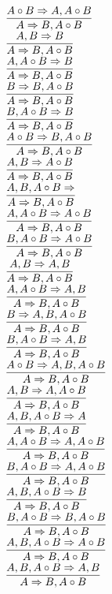 \documentclass[11pt]{article}
\begin{document}
\begin{center}
\bigskip
\\$\infer{A\Rightarrow B, A\circ B}{A\circ B\Rightarrow A, A\circ B}$
\bigskip
\\$\infer{A\Rightarrow B, A\circ B}{A, B\Rightarrow B}$
\bigskip
\\$\infer{A\Rightarrow B, A\circ B}{A, A\circ B\Rightarrow B}$
\bigskip
\\$\infer{A\Rightarrow B, A\circ B}{B\Rightarrow B, A\circ B}$
\bigskip
\\$\infer{A\Rightarrow B, A\circ B}{B, A\circ B\Rightarrow B}$
\bigskip
\\$\infer{A\Rightarrow B, A\circ B}{A\circ B\Rightarrow B, A\circ B}$
\bigskip
\\$\infer{A\Rightarrow B, A\circ B}{A, B\Rightarrow A\circ B}$
\bigskip
\\$\infer{A\Rightarrow B, A\circ B}{A, B, A\circ B\Rightarrow }$
\bigskip
\\$\infer{A\Rightarrow B, A\circ B}{A, A\circ B\Rightarrow A\circ B}$
\bigskip
\\$\infer{A\Rightarrow B, A\circ B}{B, A\circ B\Rightarrow A\circ B}$
\bigskip
\\$\infer{A\Rightarrow B, A\circ B}{A, B\Rightarrow A, B}$
\bigskip
\\$\infer{A\Rightarrow B, A\circ B}{A, A\circ B\Rightarrow A, B}$
\bigskip
\\$\infer{A\Rightarrow B, A\circ B}{B\Rightarrow A, B, A\circ B}$
\bigskip
\\$\infer{A\Rightarrow B, A\circ B}{B, A\circ B\Rightarrow A, B}$
\bigskip
\\$\infer{A\Rightarrow B, A\circ B}{A\circ B\Rightarrow A, B, A\circ B}$
\bigskip
\\$\infer{A\Rightarrow B, A\circ B}{A, B\Rightarrow A, A\circ B}$
\bigskip
\\$\infer{A\Rightarrow B, A\circ B}{A, B, A\circ B\Rightarrow A}$
\bigskip
\\$\infer{A\Rightarrow B, A\circ B}{A, A\circ B\Rightarrow A, A\circ B}$
\bigskip
\\$\infer{A\Rightarrow B, A\circ B}{B, A\circ B\Rightarrow A, A\circ B}$
\bigskip
\\$\infer{A\Rightarrow B, A\circ B}{A, B, A\circ B\Rightarrow B}$
\bigskip
\\$\infer{A\Rightarrow B, A\circ B}{B, A\circ B\Rightarrow B, A\circ B}$
\bigskip
\\$\infer{A\Rightarrow B, A\circ B}{A, B, A\circ B\Rightarrow A\circ B}$
\bigskip
\\$\infer{A\Rightarrow B, A\circ B}{A, B, A\circ B\Rightarrow A, B}$

\end{center}
\end{document}

